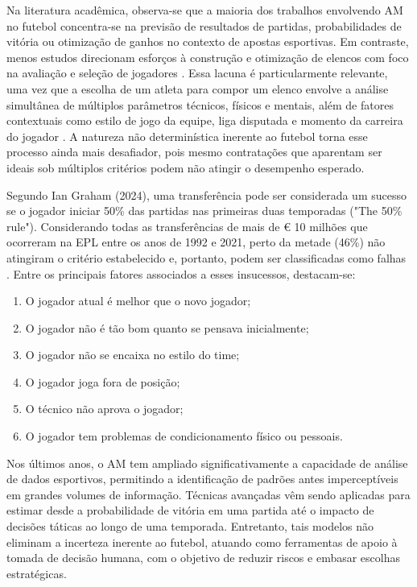 Na literatura acadêmica, observa-se que a maioria dos trabalhos envolvendo AM no futebol concentra-se na previsão de resultados de partidas, probabilidades de 
vitória ou otimização de ganhos no contexto de apostas esportivas. Em contraste, menos estudos direcionam esforços à construção e otimização de elencos com foco 
na avaliação e seleção de jogadores \cite{Abidin2021}. Essa lacuna é particularmente relevante, uma vez que a escolha de um atleta para compor um elenco envolve 
a análise simultânea de múltiplos parâmetros técnicos, físicos e mentais, além de fatores contextuais como estilo de jogo da equipe, liga disputada e momento da 
carreira do jogador \cite{Abidin2021}. A natureza não determinística inerente ao futebol torna esse processo ainda mais desafiador, pois mesmo contratações que 
aparentam ser ideais sob múltiplos critérios podem não atingir o desempenho esperado.

Segundo Ian Graham (2024), uma transferência pode ser considerada um sucesso se o jogador iniciar 50\% das partidas nas primeiras duas temporadas ("The 50\% rule"). 
Considerando todas as transferências de mais de € 10 milhões que ocorreram na EPL entre os anos de 1992 e 2021, perto da metade (46\%) não atingiram o critério 
estabelecido e, portanto, podem ser classificadas como falhas \cite{Graham2024}. Entre os principais fatores associados a esses insucessos, destacam-se:

\begin{enumerate}
    \item O jogador atual é melhor que o novo jogador;
    \item O jogador não é tão bom quanto se pensava inicialmente;
    \item O jogador não se encaixa no estilo do time;
    \item O jogador joga fora de posição;
    \item O técnico não aprova o jogador;
    \item O jogador tem problemas de condicionamento físico ou pessoais.
\end{enumerate}

Nos últimos anos, o AM tem ampliado significativamente a capacidade de análise de dados esportivos, permitindo a identificação de padrões antes 
imperceptíveis em grandes volumes de informação. Técnicas avançadas vêm sendo aplicadas para estimar desde a probabilidade de vitória em uma partida até o impacto de 
decisões táticas ao longo de uma temporada. Entretanto, tais modelos não eliminam a incerteza inerente ao futebol, atuando como ferramentas de apoio à tomada de 
decisão humana, com o objetivo de reduzir riscos e embasar escolhas estratégicas.

